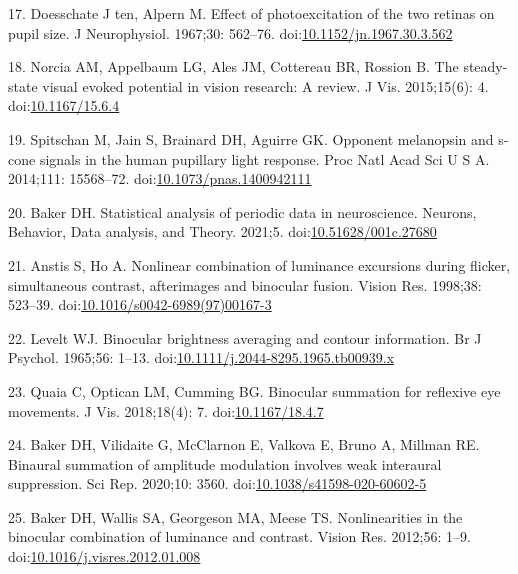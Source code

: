 \documentclass[
]{article}
\begin{document}
\leavevmode\hypertarget{ref-Doesschate1967}{}%
17. Doesschate J ten, Alpern M. Effect of photoexcitation of the two retinas on pupil size. J Neurophysiol. 1967;30: 562--76. doi:\href{https://doi.org/10.1152/jn.1967.30.3.562}{10.1152/jn.1967.30.3.562}

\leavevmode\hypertarget{ref-Norcia2015}{}%
18. Norcia AM, Appelbaum LG, Ales JM, Cottereau BR, Rossion B. The steady-state visual evoked potential in vision research: A review. J Vis. 2015;15(6): 4. doi:\href{https://doi.org/10.1167/15.6.4}{10.1167/15.6.4}

\leavevmode\hypertarget{ref-Spitschan2014}{}%
19. Spitschan M, Jain S, Brainard DH, Aguirre GK. Opponent melanopsin and s-cone signals in the human pupillary light response. Proc Natl Acad Sci U S A. 2014;111: 15568--72. doi:\href{https://doi.org/10.1073/pnas.1400942111}{10.1073/pnas.1400942111}

\leavevmode\hypertarget{ref-Baker2021}{}%
20. Baker DH. Statistical analysis of periodic data in neuroscience. Neurons, Behavior, Data analysis, and Theory. 2021;5. doi:\href{https://doi.org/10.51628/001c.27680}{10.51628/001c.27680}

\leavevmode\hypertarget{ref-Anstis1998}{}%
21. Anstis S, Ho A. Nonlinear combination of luminance excursions during flicker, simultaneous contrast, afterimages and binocular fusion. Vision Res. 1998;38: 523--39. doi:\href{https://doi.org/10.1016/s0042-6989(97)00167-3}{10.1016/s0042-6989(97)00167-3}

\leavevmode\hypertarget{ref-Levelt1965}{}%
22. Levelt WJ. Binocular brightness averaging and contour information. Br J Psychol. 1965;56: 1--13. doi:\href{https://doi.org/10.1111/j.2044-8295.1965.tb00939.x}{10.1111/j.2044-8295.1965.tb00939.x}

\leavevmode\hypertarget{ref-Quaia2018}{}%
23. Quaia C, Optican LM, Cumming BG. Binocular summation for reflexive eye movements. J Vis. 2018;18(4): 7. doi:\href{https://doi.org/10.1167/18.4.7}{10.1167/18.4.7}

\leavevmode\hypertarget{ref-Baker2020}{}%
24. Baker DH, Vilidaite G, McClarnon E, Valkova E, Bruno A, Millman RE. Binaural summation of amplitude modulation involves weak interaural suppression. Sci Rep. 2020;10: 3560. doi:\href{https://doi.org/10.1038/s41598-020-60602-5}{10.1038/s41598-020-60602-5}

\leavevmode\hypertarget{ref-Baker2012}{}%
25. Baker DH, Wallis SA, Georgeson MA, Meese TS. Nonlinearities in the binocular combination of luminance and contrast. Vision Res. 2012;56: 1--9. doi:\href{https://doi.org/10.1016/j.visres.2012.01.008}{10.1016/j.visres.2012.01.008}
\end{document}
